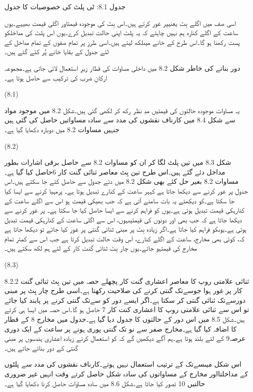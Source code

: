 جدول 8.1: ٹی پلٹ کی خصوصیات کا جدول

	اسی صف میں اگلے بِٹ یعنیپر غور کرتے ہیں۔اس بِٹ کی موجودہ قیمتاور اگلی قیمت بھیہے۔یوں ساعت کے اگلے کنارہ ہم نہیں چاہتے کہ یہ پلٹ اپنی حالت تبدیل کرے۔یوں اس پلٹ کی مداخلکو پست رکھنا ہو گا۔اس طرح کے خانے میںلکھ لیتے ہیں۔اسی طرزِ پر تمام صفوں کے تمام مداخل کے لئے جدول کے بقایا خانے پُر کئے گئے ہیں۔


	دور بنانے کی خاطر شکل 8.2 میں داخلی مساوات کی قطار زیرِ استعمال لائی جاتی ہے۔مجموعہ ارکانِ ضرب کی ترکیب سے حاصل ہوتا ہے۔

 
(8.1)

	یہ مساوات موجودہ حالتوں کی قیمتیں مدِ نظر رکھ کر لکھی گئی ہیں۔شکل 8.2 میں موجود مواد سے شکل 8.4 میں کارناف نقشوں کی مدد سے سادہ مساواتیں حاصل کی گئی ہیں جنہیں مساوات 8.2 میں دوبارہ دکھایا گیا ہے۔



 
(8.2)

	شکل 8.3 میں تین پلٹ لگا کر ان کو مساوات 8.2 سے حاصل برقی اشارات بطور مداخل دئے گئے ہیں۔اس طرح تین بِٹ معاصر ثنائی گنت کار  6حاصل کیا گیا ہے۔
	مساوات 8.2 بغیر حل کئے بھی شکل 8.2 میں دئے جدول سے حاصل کئے جا سکتے ہیں۔اس جدول پر غور کرنے سے دیکھا جاتا ہے کہہر ساعت کے کنارے تبدیل ہوتا ہے۔ پرمہیا کرنے سے ایسا کیا جا سکتا ہے۔کو دیکھتے یہ بات سامنے آتی ہے کہ جب بھیکی قیمت ہو اس سے اگلے ساعت کے کنارہکی قیمت تبدیل ہوتی ہے۔یوں کو فراہم کرنے سے ایسا حاصل کیا جا سکتا ہے۔ پر غور کرنے سے دیکھا جاتا ہے کہ جب بھی اور دونوں کی قیمتیںہوں، اس سے اگلی ساعت کے کنارہکی قیمت تبدیل ہوتی ہے۔یوںکو فراہم کیا جاتا ہے۔اگر زیادہ بِٹ پر مبنی ثنائی گنتی پر غور کیا جائے تو دیکھا جاتا ہے کہ، کوئی بھی مخارج، ساعت کے اگلے کنارے، اس وقت حالت تبدیل کرتا ہے جب اس سے کمتر تمام مخارج کی قیمتہو جائے۔یوں چار بِٹ ثنائی گنت کار کے لئے ہم لکھ سکتے ہیں۔

 
(8.3)


8.2.2 ثنائی علامتی روپ کا معاصر اعشاری گنت کار
	پچھلے حصہ میں تین بِٹ ثنائی گنت کار پر غور ہوا جوسےتک گنتی کرنے کی صلاحیت رکھتا ہے۔اسی طرح چار بِٹ پر مبنی دورسےتک ثنائی گنتی کر سکتا ہے۔اگر ایسے دور کو سےتک گنتی کرنے پر پابند کیا جائے تو اس سے ثنائی علامتی روپ کا اعشاری کنت کار 7 حاصل ہو گا۔اس حصہ میں ایسا ہی کرتے ہیں۔شکل 8.5 میں اس دور کے حالتوں کا جدول دیا گیا ہے۔جدول میں مخارج 8 کے قطار کا اضافہ کیا گیا ہے۔مخارج صفر سے نو تک گنتی پوری ہونے پر ساعت کے ایک دوری عرصہ9 کے لئے بلند ہوتا ہے۔ہم آگے دیکھیں گے کہ  کو استعمال کرتے زیادہ اعشاری ہندسوں پر مبنی گنتی کے دور بنائے جاتے ہیں۔




	اس شکل میںسےتک کے ترتیب استعمال نہیں ہوتے۔کارناف نقشوں کی مدد سے پلٹوں کے مداخلتااور مخارج کے مساواتوں کی سادہ شکل حاصل کرتے وقت انہیں غیر ضروری حالتیں 10 تصور کیا جاتا ہے۔شکل 8.6 میں سادہ مساوات حاصل کرنا دکھایا گیا ہے۔


